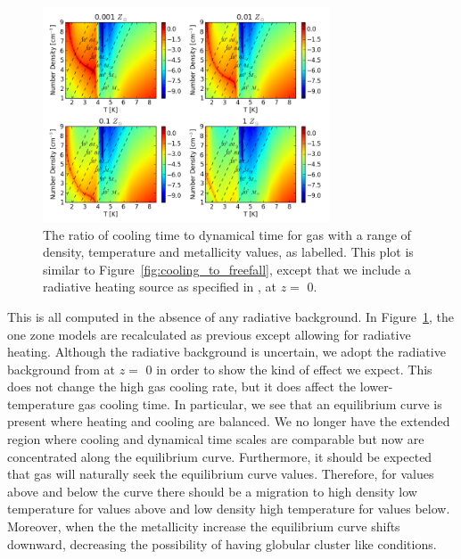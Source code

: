 \documentclass[useAMS,usenatbib]{mn2e}
\begin{document}
\begin{figure}
\begin{center}
\mbox{\includegraphics[width=8.5cm]{Images/cooling_to_freefall}}
\end{center}
\caption{\label{fig:cooling_to_freefall_background} The ratio of cooling time to dynamical time for gas with a range of density, temperature and metallicity values, as labelled.  This plot is similar to Figure~\ref{fig:cooling_to_freefall}, except that we include a radiative heating source as specified in \citet{Haardt2012}, at $z=$ 0.}
\end{figure}

This is all computed in the absence of any radiative background.  In Figure~\ref{fig:cooling_to_freefall_background}, 
the one zone models are recalculated as previous except allowing for radiative heating.   Although the radiative background
is uncertain, we adopt the radiative background from \citet{Haardt2012} at $z=$ 0 
in order to show the kind of effect we expect.  This does not change the high gas cooling rate, but it does affect the lower-temperature gas cooling time.   In particular, we see that an equilibrium curve is present where
heating and cooling are balanced. We no longer have the extended region where cooling and dynamical time scales are 
comparable but now are concentrated along the equilibrium curve. Furthermore, it should be expected that gas will
naturally seek the equilibrium curve values. Therefore, for values above and below the curve there should be a migration
to high density low temperature for values above and low density high temperature for values below.  Moreover, when the
the metallicity increase the equilibrium curve shifts downward, decreasing the possibility of having globular cluster
like conditions.
\end{document}
